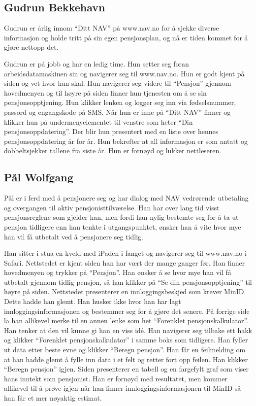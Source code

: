 \documentclass[informationsecurity]{gucmasterproject}
\begin{document}
\subsection{Gudrun Bekkehavn}
Gudrun er årlig innom “Ditt NAV” på www.nav.no for å sjekke diverse informasjon og holde tritt på sin egen pensjonsplan, og nå er tiden kommet for å gjøre nettopp det.

Gudrun er på jobb og har en ledig time. Hun setter seg foran arbeidsdatamaskinen sin og navigerer seg til www.nav.no. Hun er godt kjent på siden og vet hvor hun skal. Hun navigerer seg videre til “Pensjon” gjennom hovedmenyen og til høyre på siden finner hun tjenesten om å se sin pensjonsopptjening. Hun klikker lenken og logger seg inn via fødselsnummer, passord og engangskode på SMS. Når hun er inne på “Ditt NAV” finner og klikker hun på undermenyelementet til venstre som heter “Din pensjonsoppdatering”. Der blir hun presentert med en liste over hennes pensjonsoppdatering år for år. Hun bekrefter at all informasjon er som antatt og dobbeltsjekker tallene fra siste år. Hun er fornøyd og lukker nettleseren.

\subsection{Pål Wolfgang}
Pål er i ferd med å pensjonere seg og har dialog med NAV vedrørende utbetaling og overgangen til aktiv pensjonisttilværelse. Han har over lang tid visst pensjonsreglene som gjelder han, men fordi han nylig bestemte seg for å ta ut pensjon tidligere enn han tenkte i utgangspunktet, ønsker han å vite hvor mye han vil få utbetalt ved å pensjonere seg tidlig.

Han sitter i stua en kveld med iPaden i fanget og navigerer seg til www.nav.no i Safari. Nettstedet er kjent siden han har vært der mange ganger før. Han finner hovedmenyen og trykker på “Pensjon”. Han ønsker å se hvor mye han vil få utbetalt gjennom tidlig pensjon, så han klikker på “Se din pensjonsopptjening” til høyre på siden. Nettstedet presenterer en innloggingsbeskjed som krever MinID. Dette hadde han glemt. Han husker ikke hvor han har lagt innloggingsinformasjonen og bestemmer seg for å gjøre det senere. På forrige side la han allikevel merke til en annen lenke som het “Forenklet pensjonskalkulator”. Han tenker at den vil kunne gi han en viss idé. Han navigerer seg tilbake ett hakk og klikker “Forenklet pensjonskalkulator” i samme boks som tidligere. Han fyller ut data etter beste evne og klikker “Beregn pensjon”. Han får en feilmelding om at han hadde glemt å fylle inn data i et felt og retter fort opp feilen. Han klikker “Beregn pensjon” igjen. Siden presenterer en tabell og en fargefylt graf som viser hans inntekt som pensjonist. Han er fornøyd med resultatet, men kommer allikevel til å prøve igjen når han finner innloggingsinformasjonen til MinID så han får et mer nøyaktig estimat.
\end{document}
